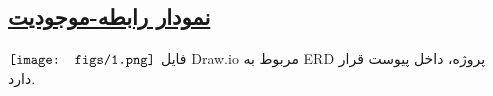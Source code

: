 \subsection*{\underline{نمودار رابطه-موجودیت}}

$\\ \texttt{[image: figs/1.png]}$
فایل Draw.io مربوط به ERD پروژه، داخل پیوست قرار دارد. 